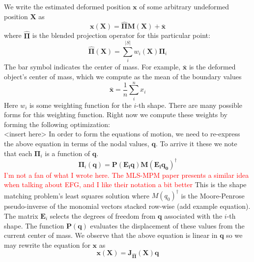 \documentclass[sigconf]{acmart}
\newcommand\myworries[1]{\textcolor{red}{#1}}
\begin{document}
    
We write the estimated deformed position $\mathbf{x}$ of some arbitrary undeformed position $\mathbf{X}$ as
\begin{equation}
     \mathbf{x}(\mathbf{X}) = \hat{\mathbf{\Pi}}\mathbf{M}(\mathbf{X}) + \bar{\mathbf{x}} 
\end{equation}
where $\mathbf{\hat{\Pi}}$ is the blended projection operator for this particular point:
\begin{equation}
    \hat{\mathbf{\Pi}}\mathbf{(X)} = \sum_i^{|S|}w_i(\mathbf{X})\mathbf{\Pi}_i 
\end{equation}
The bar symbol indicates the center of mass. For example, $\bar{\mathbf{x}}$ is the deformed object's center of mass, which we compute as the mean of the boundary values 
\begin{equation}
    \bar{\mathbf{x}} = \frac{1}{n}\sum_i^n x_i 
\end{equation}
Here $w_i$ is some weighting function for the $i$-th shape. There are many possible forms for this weighting function. Right now we compute these weights by forming the following optimization: \\
<insert here>
In order to form the equations of motion, we need to re-express the above equation in terms of the nodal values, $\mathbf{q}$. To arrive it these we note that each $\mathbf{\Pi}_i$ is a function of $\mathbf{q}$. 
\begin{equation}
    \mathbf{\Pi}_i(\mathbf{q}) = \mathbf{P(E_i q)M(E_i q_0)^{\dagger}}
\end{equation}
\myworries{I'm not a fan of what I wrote here. The MLS-MPM paper presents a similar idea when talking about EFG, and I like their notation a bit better}
This is the shape matching problem's least squares solution where $M(q_0)^{\dagger}$ is the Moore-Penrose pseudo-inverse of the monomial vectors stacked row-wise (add example equation). The matrix $\mathbf{E}_i$ selects the degrees of freedom from $\mathbf{q}$ associated with the $i$-th shape. The function $\mathbf{P(q)}$ evaluates the displacement of these values from the current center of mass. We observe that the above equation is linear in $\mathbf{q}$ so we may rewrite the equation for $\mathbf{x}$ as 
\begin{equation}
    \mathbf{x(X)} = \mathbf{J_{\hat{\Pi}}(X)q}
\end{equation}
\end{document}
